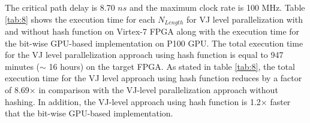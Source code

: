 The critical path delay is  8.70 $ns$ and the maximum clock rate is 100 MHz. Table \ref{tab:8} shows the execution time for each $N_{Length}$ for VJ level parallelization  with and without hash function on Virtex-7 FPGA along with the execution time for the bit-wise GPU-based implementation on P100 GPU. The total execution time for the VJ level parallelization approach using hash function is equal to 947 minutes ($\sim$ 16 hours) on the target FPGA. As stated in table \ref{tab:8}, the total execution time for the VJ level approach using hash function reduces by a factor of 8.69$\times$ in comparison with the VJ-level parallelization approach without hashing. In addition, the VJ-level approach using hash function is 1.2$\times$ faster that the bit-wise GPU-based implementation.

\begin{table}[t!]
\caption{Execution time for the VJ level parallelization approach with and without hash function for FPGA-based implementation using Virtex-7 in comparison with the bit-wise GPU-based implementations using P100.}
\begin{center}

  \label{tab:8}
\end{center}
\end{table}


